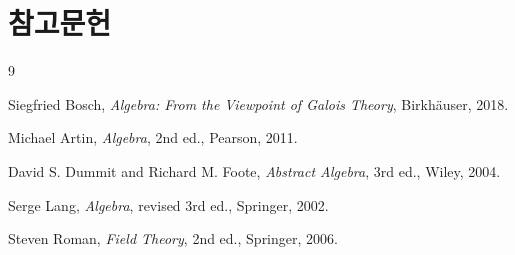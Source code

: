 \chapter*{참고문헌}

\begin{thebibliography}{9}

Siegfried Bosch,
\emph{Algebra: From the Viewpoint of Galois Theory},
Birkh\"auser, 2018.

Michael Artin,
\emph{Algebra}, 2nd ed.,
Pearson, 2011.

David S. Dummit and Richard M. Foote,
\emph{Abstract Algebra}, 3rd ed.,
Wiley, 2004.

Serge Lang,
\emph{Algebra}, revised 3rd ed.,
Springer, 2002.

Steven Roman,
\emph{Field Theory}, 2nd ed.,
Springer, 2006.

\end{thebibliography}
